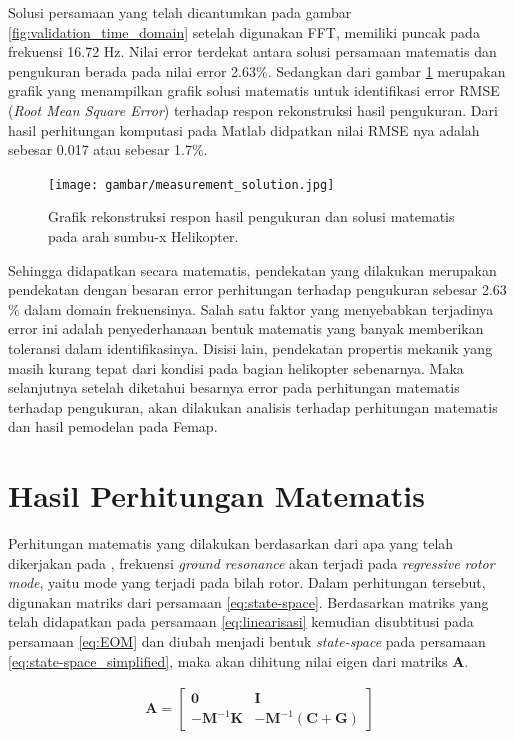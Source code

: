 Solusi persamaan yang telah dicantumkan pada gambar \ref{fig:validation_time_domain} setelah digunakan FFT, memiliki puncak pada frekuensi 16.72 Hz. Nilai error terdekat antara solusi persamaan matematis dan pengukuran berada pada nilai error 2.63$\%$. Sedangkan dari gambar \ref{fig:measur_solution} merupakan grafik yang menampilkan grafik solusi matematis untuk identifikasi error RMSE (\textit{Root Mean Square Error}) terhadap respon rekonstruksi hasil pengukuran. Dari hasil perhitungan komputasi pada Matlab didpatkan nilai RMSE nya adalah sebesar 0.017 atau sebesar 1.7$\%$.

\begin{figure}[H]
	\centering
	\texttt{[image: gambar/measurement\_solution.jpg]}
	\caption{Grafik rekonstruksi respon hasil pengukuran dan solusi matematis pada arah sumbu-x Helikopter.}
	\label{fig:measur_solution}
\end{figure}

Sehingga didapatkan secara matematis, pendekatan yang dilakukan merupakan pendekatan dengan besaran error perhitungan terhadap pengukuran sebesar 2.63$\%$ dalam domain frekuensinya. Salah satu faktor yang menyebabkan terjadinya error ini adalah penyederhanaan bentuk matematis yang banyak memberikan toleransi dalam identifikasinya. Disisi lain, pendekatan propertis mekanik yang masih kurang tepat dari kondisi pada bagian helikopter sebenarnya. Maka selanjutnya setelah diketahui besarnya error pada perhitungan matematis terhadap pengukuran, akan dilakukan analisis terhadap perhitungan matematis dan hasil pemodelan pada Femap.

\section{Hasil Perhitungan Matematis}

Perhitungan matematis yang dilakukan berdasarkan dari apa yang telah dikerjakan pada \cite{BERGEOT201672}, frekuensi \textit{ground resonance} akan terjadi pada \textit{regressive rotor mode}, yaitu mode yang terjadi pada bilah rotor. Dalam perhitungan tersebut, digunakan matriks dari persamaan \ref{eq:state-space}. Berdasarkan matriks yang telah didapatkan pada persamaan \ref{eq:linearisasi} kemudian disubtitusi pada persamaan \ref{eq:EOM} dan diubah menjadi bentuk \textit{state-space} pada persamaan \ref{eq:state-space_simplified}, maka akan dihitung nilai eigen dari matriks \textbf{A}.

\begin{align*}
	\mathbf{A}=\begin{bmatrix}
	\mathbf{0}& \mathbf{I}\\
	\mathbf{-M}^{-1}\mathbf{K}& \mathbf{-M}^{-1}(\mathbf{C}+\mathbf{G})
	\end{bmatrix}
\end{align*}

